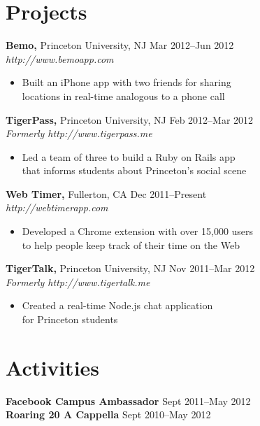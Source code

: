 \documentclass[margin]{res}
\begin{document}
\begin{resume}

\section{Projects}
 {\bf Bemo,} Princeton University, NJ \hfill Mar 2012--Jun 2012 \\
 {\it http://www.bemoapp.com}
 \begin{itemize} \itemsep -2pt  %
 \item Built an iPhone app with two friends for sharing \\
   locations in real-time analogous to a phone call
 \end{itemize}

 {\bf TigerPass,} Princeton University, NJ \hfill Feb 2012--Mar 2012 \\
 {\it Formerly http://www.tigerpass.me}
 \begin{itemize} \itemsep -2pt  %
 \item Led a team of three to build a Ruby on Rails app \\
   that informs students about Princeton's social scene
 \end{itemize}

 {\bf Web Timer,} Fullerton, CA \hfill Dec 2011--Present \\
 {\it http://webtimerapp.com}
 \begin{itemize} \itemsep -2pt  %
 \item Developed a Chrome extension with over 15,000 users \\
   to help people keep track of their time on the Web
 \end{itemize}

 {\bf TigerTalk,} Princeton University, NJ \hfill Nov 2011--Mar 2012 \\
 {\it Formerly http://www.tigertalk.me}
 \begin{itemize} \itemsep -2pt  %
 \item Created a real-time Node.js chat application \\
   for Princeton students
 \end{itemize}

\section{Activities}
 {\bf Facebook Campus Ambassador} \hfill Sept 2011--May 2012 \\
 {\bf Roaring 20 A Cappella} \hfill Sept 2010--May 2012 \\

\end{resume}
\end{document}
